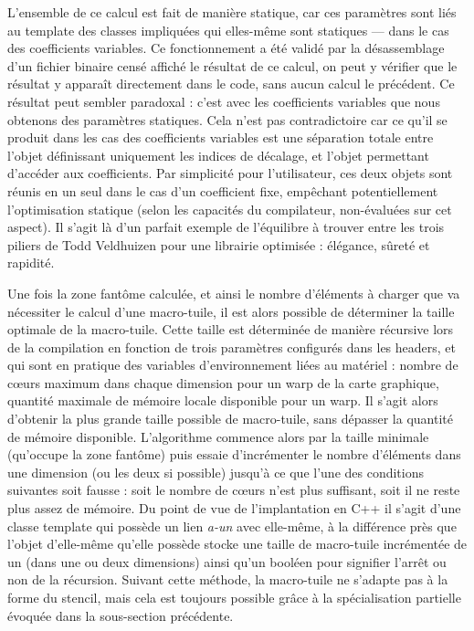 L'ensemble de ce calcul est fait de manière statique, car ces paramètres sont liés au template des classes impliquées qui elles-même sont statiques --- dans le cas des coefficients variables. Ce fonctionnement a été validé par la désassemblage d'un fichier binaire censé affiché le résultat de ce calcul, on peut y vérifier que le résultat y apparaît directement dans le code, sans aucun calcul le précédent. Ce résultat peut sembler paradoxal : c'est avec les coefficients variables que nous obtenons des paramètres statiques. Cela n'est pas contradictoire car ce qu'il se produit dans les cas des coefficients variables est une séparation totale entre l'objet définissant uniquement les indices de décalage, et l'objet permettant d'accéder aux coefficients. Par simplicité pour l'utilisateur, ces deux objets sont réunis en un seul dans le cas d'un coefficient fixe, empêchant potentiellement l'optimisation statique (selon les capacités du compilateur, non-évaluées sur cet aspect). Il s'agit là d'un parfait exemple de l'équilibre à trouver entre les trois piliers de Todd Veldhuizen pour une librairie optimisée : élégance, sûreté et rapidité.

Une fois la zone fantôme calculée, et ainsi le nombre d'éléments à charger que va nécessiter le calcul d'une macro-tuile, il est alors possible de déterminer la taille optimale de la macro-tuile. Cette taille est déterminée de manière récursive lors de la compilation en fonction de trois paramètres configurés dans les headers, et qui sont en pratique des variables d'environnement liées au matériel : nombre de cœurs maximum dans chaque dimension pour un warp de la carte graphique, quantité maximale de mémoire locale disponible pour un warp. Il s'agit alors d'obtenir la plus grande taille possible de macro-tuile, sans dépasser la quantité de mémoire disponible. L'algorithme commence alors par la taille minimale (qu'occupe la zone fantôme) puis essaie d'incrémenter le nombre d'éléments dans une dimension (ou les deux si possible) jusqu'à ce que l'une des conditions suivantes soit fausse : soit le nombre de cœurs n'est plus suffisant, soit il ne reste plus assez de mémoire. Du point de vue de l'implantation en \textsf{C++} il s'agit d'une classe template qui possède un lien \emph{a-un} avec elle-même, à la différence près que l'objet d'elle-même qu'elle possède stocke une taille de macro-tuile incrémentée de un (dans une ou deux dimensions) ainsi qu'un booléen pour signifier l'arrêt ou non de la récursion. Suivant cette méthode, la macro-tuile ne s'adapte pas à la forme du stencil, mais cela est toujours possible grâce à la spécialisation partielle évoquée dans la sous-section précédente.

